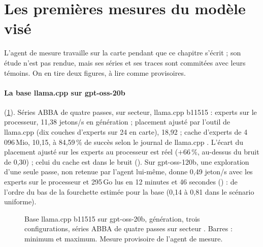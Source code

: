 \section{Les premières mesures du modèle visé}\label{sec:premieres-mesures}

L'agent de mesure travaille sur la carte pendant que ce chapitre s'écrit ; son étude n'est pas rendue, mais ses séries et ses traces sont commitées avec leurs témoins. On en tire deux figures, à lire comme provisoires.

\paragraph{La base llama.cpp sur gpt-oss-20b} (\cref{fig:base-20b}). Séries ABBA de quatre passes, sur secteur, llama.cpp b11515 : experts sur le processeur, 11,38 jetons/s en génération ; placement ajusté par l'outil de llama.cpp (dix couches d'experts sur 24 en carte), 18,92 ; cache d'experts de 4\,096\,Mio, 10,15, à 84,59\,\% de succès selon le journal de llama.cpp \mes. L'écart du placement ajusté sur les experts au processeur est réel ($+66\,\%$, au-dessus du bruit de 0,30) ; celui du cache est dans le bruit (). Sur gpt-oss-120b, une exploration d'une seule passe, non retenue par l'agent lui-même, donne 0,49 jeton/s avec les experts sur le processeur et 295\,Go lus en 12 minutes et 46 secondes () : de l'ordre du bas de la fourchette estimée pour la base (0,14 à 0,81 dans le scénario uniforme).

\begin{figure}[ht]
\centering
\GrapheBaseVingt
\caption[Base llama.cpp sur gpt-oss-20b]{Base llama.cpp b11515 sur gpt-oss-20b, génération, trois configurations, séries ABBA de quatre passes sur secteur \mes. Barres : minimum et maximum. Mesure provisoire de l'agent de mesure.}
\label{fig:base-20b}
\end{figure}

